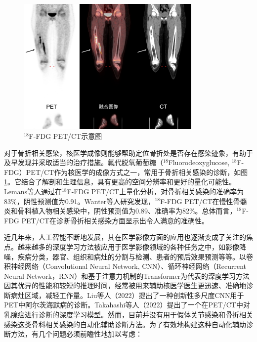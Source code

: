 \begin{figure}[ht]
  \centering
  \includegraphics[width=0.8\textwidth]{figures/chap01_PETCT.jpg}
  \caption{\(^{18}\)F-FDG PET/CT示意图}
  \label{fig:chap01_PETCT}
\end{figure}

对于骨折相关感染，核医学成像则能够帮助定位骨折处是否存在感染迹象，有助于及早发现并采取适当的治疗措施。氟代脱氧葡萄糖（\(^{18}\)Fluorodeoxyglucose, \(^{18}\)F-FDG）PET/CT作为核医学的成像方式之一，常用于骨折相关感染的诊断\cite{zhang2021comparative}，如图\ref{fig:chap01_PETCT}。它结合了解剖和生理信息，具有更高的空间分辨率和更好的量化可能性\cite{gholamrezanezhad2018clinical}。Lemans等人\cite{lemans2019diagnostic}通过在\(^{18}\)F-FDG PET/CT上量化分析，对骨折相关感染的准确率为83\%，阴性预测值为0.91。Wanter等人\cite{wenter2016diagnostic}研究发现，\(^{18}\)F-FDG PET/CT在慢性骨髓炎和骨科植入物相关感染中，阴性预测值为0.89、准确率为82\%。总体而言，\(^{18}\)F-FDG PET/CT在诊断骨折相关感染方面显示出令人满意的准确性。

近几年来，人工智能不断地发展，其在医学影像方面的应用也逐渐变成了关注的焦点。越来越多的深度学习方法被应用于医学影像领域的各种任务之中，如影像降噪，疾病分类，器官、组织和病灶的分割与检测、患者的预后效果预测等等\cite{ZSZD202307032,YJTY202304021}。以卷积神经网络（Convolutional Neural Network, CNN）、循环神经网络（Recurrent Neural Network，RNN）和基于注意力机制的Transformer为代表的深度学习方法因其优异的性能和较短的推理时间，经常被用来辅助核医学医生更迅速、准确地诊断病灶区域，减轻工作量。Liu等人\cite{liu2022diagnosis}（2022）提出了一种创新性多尺度CNN用于PET中阿尔茨海默病的诊断。Takahashi等人\cite{takahashi2022deep}（2022）提出了一个在PET/CT中对乳腺癌进行诊断的深度学习模型。然而，目前并没有用于假体关节感染和骨折相关感染这类骨科相关感染的自动化辅助诊断方法。为了有效地构建这种自动化辅助诊断方法，有几个问题必须前瞻性地加以考虑：

